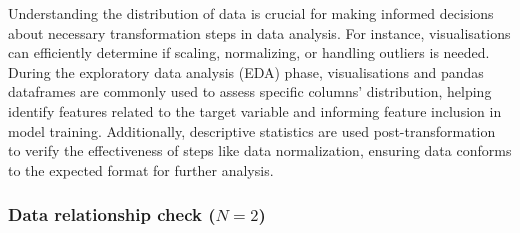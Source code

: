 Understanding the distribution of data is crucial for making informed decisions about necessary transformation steps in data analysis. For instance, visualisations can efficiently determine if scaling, normalizing, or handling outliers is needed. During the exploratory data analysis (EDA) phase, visualisations and pandas dataframes are commonly used to assess specific columns' distribution, helping identify features related to the target variable and informing feature inclusion in model training. Additionally, descriptive statistics are used post-transformation to verify the effectiveness of steps like data normalization, ensuring data conforms to the expected format for further analysis.


\subsubsection{Data relationship check ($N = 2$)}~\label{sec:linear-relation-output}

